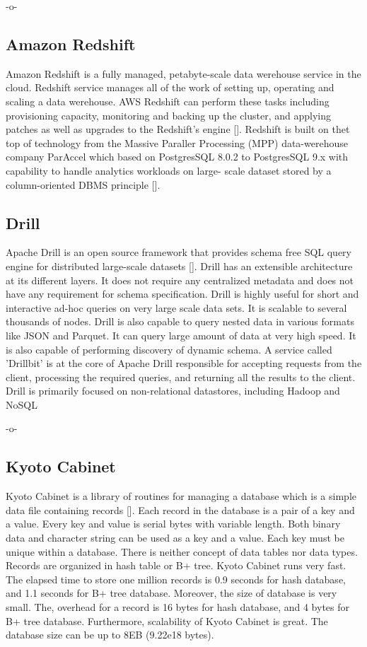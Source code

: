      -o-

     
\subsection{Amazon Redshift}
     
Amazon Redshift is a fully managed, petabyte-scale data werehouse
service in the cloud. Redshift service manages all of the work of
setting up, operating and scaling a data werehouse. AWS Redshift can
perform these tasks including provisioning capacity, monitoring and
backing up the cluster, and applying patches as well as upgrades to
the Redshift's engine [\cite{www-redshift}].  Redshift is built on thet
top of technology from the Massive Paraller Processing (MPP)
data-werehouse company ParAccel which based on PostgresSQL 8.0.2 to
PostgresSQL 9.x with capability to handle analytics workloads on
large- scale dataset stored by a column-oriented DBMS
principle [\cite{www-wiki-red}].

\subsection{Drill}

Apache Drill is an open source framework that provides schema free SQL
query engine for distributed large-scale
datasets [\cite{www-ApacheDrill}]. Drill has an extensible architecture
at its different layers. It does not require any centralized metadata
and does not have any requirement for schema specification. Drill is
highly useful for short and interactive ad-hoc queries on very large
scale data sets. It is scalable to several thousands of nodes. Drill
is also capable to query nested data in various formats like JSON and
Parquet. It can query large amount of data at very high speed. It is
also capable of performing discovery of dynamic schema.  A service
called 'Drillbit' is at the core of Apache Drill responsible for
accepting requests from the client, processing the required queries,
and returning all the results to the client.  Drill is primarily
focused on non-relational datastores, including Hadoop and NoSQL

     -o-

\subsection{Kyoto Cabinet}

Kyoto Cabinet is a library of routines for managing a database which
is a simple data file containing records [\cite{www-KyotoCabinet}].
Each record in the database is a pair of a key and a value. Every key
and value is serial bytes with variable length. Both binary data and
character string can be used as a key and a value. Each key must be
unique within a database.  There is neither concept of data tables nor
data types. Records are organized in hash table or B+ tree. Kyoto
Cabinet runs very fast. The elapsed time to store one million records
is 0.9 seconds for hash database, and 1.1 seconds for B+ tree
database. Moreover, the size of database is very small. The, overhead
for a record is 16 bytes for hash database, and 4 bytes for B+ tree
database. Furthermore, scalability of Kyoto Cabinet is great. The
database size can be up to 8EB (9.22e18 bytes).



